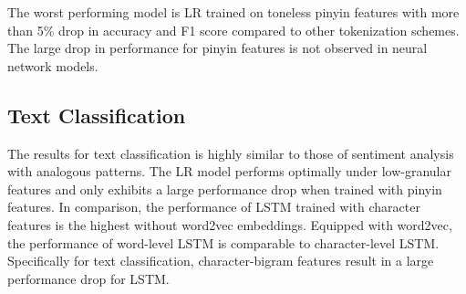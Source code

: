 The worst performing model is LR trained on toneless pinyin features with more than 5\% drop in accuracy and F1 score compared to other tokenization schemes. The large drop in performance for pinyin features is not observed in neural network models.

\subsection{Text Classification}
The results for text classification is highly similar to those of sentiment analysis with analogous patterns. The LR model performs optimally under low-granular features and only exhibits a large performance drop when trained with pinyin features. In comparison, the performance of LSTM trained with character features is the highest without word2vec embeddings. Equipped with word2vec, the performance of word-level LSTM is comparable to character-level LSTM. Specifically for text classification, character-bigram features result in a large performance drop for LSTM.  